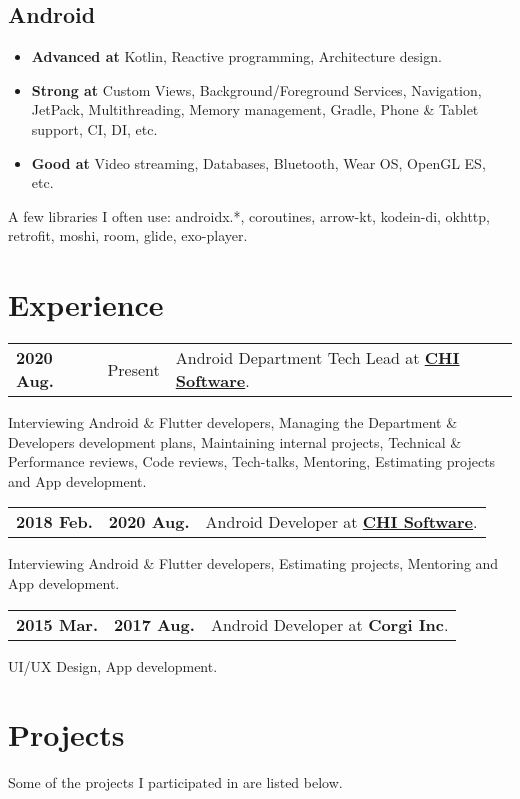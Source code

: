 \documentclass[a4paper]{article}
\begin{document}
	\subsection*{Android}
	\begin{multicols}{2}
	\begin{itemize}
		\item \textbf{Advanced at} Kotlin, Reactive programming, Architecture design.
		\item \textbf{Strong at} Custom Views, Background/Foreground Services, Navigation, JetPack, Multithreading, Memory management, Gradle, Phone \& Tablet support, CI, DI, etc.
		\item \textbf{Good at} Video streaming, Databases, Bluetooth, Wear OS, OpenGL ES, etc.
	\end{itemize}
	\end{multicols}
	
	{ \footnotesize
	A few libraries I often use: androidx.*, coroutines, arrow-kt, kodein-di, okhttp, retrofit, moshi, room, glide, exo-player.       
	}
	
	\section*{Experience}
	\begin{tabular}{@{}l@{\enspace--\enspace}ll}
		\textbf{2020 Aug.} & Present & Android Department Tech Lead at \href{https://chisw.com}{\textbf{CHI Software}}. \\
	\end{tabular}
	Interviewing Android & Flutter developers, Managing the Department \& Developers development plans, Maintaining internal projects, Technical & Performance reviews, Code reviews, Tech-talks, Mentoring, Estimating projects and App development.    
	\begin{tabular}{@{}l@{\enspace--\enspace}ll}
		\textbf{2018 Feb.} & \textbf{2020 Aug.} & Android Developer at \href{https://chisw.com}{\textbf{CHI Software}}. \\
	\end{tabular}
	Interviewing Android \& Flutter developers, Estimating projects, Mentoring and App development.    
	\begin{tabular}{@{}l@{\enspace--\enspace}ll}
		\textbf{2015 Mar.} & \textbf{2017 Aug.} & Android Developer at \textbf{Corgi Inc}. \\
	\end{tabular}
	UI/UX Design, App development. 

	\section*{Projects}
	Some of the projects I participated in are listed below. 
\end{document}
